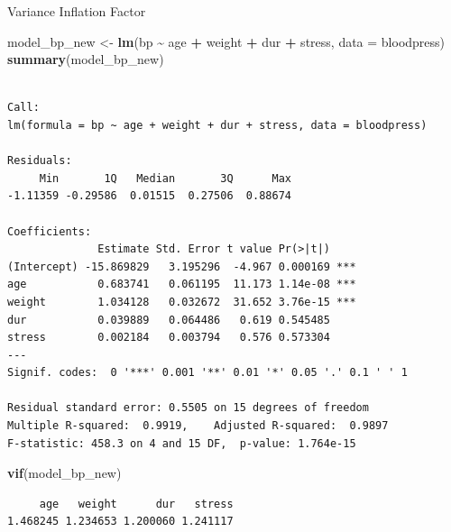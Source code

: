 \documentclass[
  ignorenonframetext,
]{beamer}
\newenvironment{Shaded}{\begin{snugshade}}{\end{snugshade}}
\newcommand{\AttributeTok}[1]{\textcolor[rgb]{0.13,0.29,0.53}{#1}}
\newcommand{\FunctionTok}[1]{\textcolor[rgb]{0.13,0.29,0.53}{\textbf{#1}}}
\newcommand{\NormalTok}[1]{#1}
\newcommand{\OtherTok}[1]{\textcolor[rgb]{0.56,0.35,0.01}{#1}}
\newcommand{\SpecialCharTok}[1]{\textcolor[rgb]{0.81,0.36,0.00}{\textbf{#1}}}
\begin{document}
\begin{frame}[fragile]{Variance Inflation Factor}
\label{variance-inflation-factor-4}
\tiny

\begin{Shaded}
\begin{Highlighting}[]
\NormalTok{model\_bp\_new }\OtherTok{\textless{}{-}} \FunctionTok{lm}\NormalTok{(bp }\SpecialCharTok{\textasciitilde{}}\NormalTok{ age }\SpecialCharTok{+}\NormalTok{ weight }\SpecialCharTok{+}\NormalTok{ dur }\SpecialCharTok{+}\NormalTok{ stress, }\AttributeTok{data =}\NormalTok{ bloodpress)}
\FunctionTok{summary}\NormalTok{(model\_bp\_new)}
\end{Highlighting}
\end{Shaded}

\begin{verbatim}

Call:
lm(formula = bp ~ age + weight + dur + stress, data = bloodpress)

Residuals:
     Min       1Q   Median       3Q      Max 
-1.11359 -0.29586  0.01515  0.27506  0.88674 

Coefficients:
              Estimate Std. Error t value Pr(>|t|)    
(Intercept) -15.869829   3.195296  -4.967 0.000169 ***
age           0.683741   0.061195  11.173 1.14e-08 ***
weight        1.034128   0.032672  31.652 3.76e-15 ***
dur           0.039889   0.064486   0.619 0.545485    
stress        0.002184   0.003794   0.576 0.573304    
---
Signif. codes:  0 '***' 0.001 '**' 0.01 '*' 0.05 '.' 0.1 ' ' 1

Residual standard error: 0.5505 on 15 degrees of freedom
Multiple R-squared:  0.9919,    Adjusted R-squared:  0.9897 
F-statistic: 458.3 on 4 and 15 DF,  p-value: 1.764e-15
\end{verbatim}

\begin{Shaded}
\begin{Highlighting}[]
\FunctionTok{vif}\NormalTok{(model\_bp\_new)}
\end{Highlighting}
\end{Shaded}

\begin{verbatim}
     age   weight      dur   stress 
1.468245 1.234653 1.200060 1.241117 
\end{verbatim}

\normalsize
\end{frame}
\end{document}
